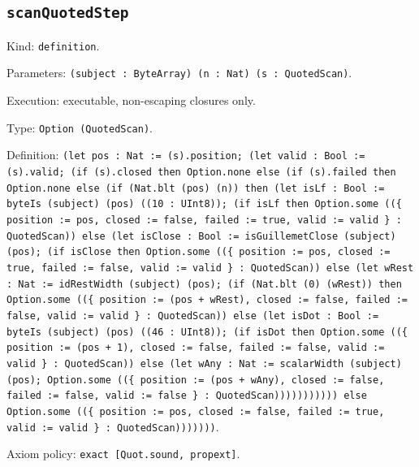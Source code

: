 \documentclass[11pt]{article}
\begin{document}
\subsection*{\texttt{scanQuotedStep}}
\noindent Kind: \texttt{definition}.\par
\noindent Parameters: \texttt{(subject : ByteArray) (n : Nat) (s : QuotedScan)}.\par
\noindent Execution: executable, non-escaping closures only.\par
\noindent Type: \texttt{Option (QuotedScan)}.\par
\noindent Definition: \texttt{(let pos : Nat := (s).position; (let valid : Bool := (s).valid; (if (s).closed then Option.none else (if (s).failed then Option.none else (if (Nat.blt (pos) (n)) then (let isLf : Bool := byteIs (subject) (pos) ((10 : UInt8)); (if isLf then Option.some ((\{ position := pos, closed := false, failed := true, valid := valid \} : QuotedScan)) else (let isClose : Bool := isGuillemetClose (subject) (pos); (if isClose then Option.some ((\{ position := pos, closed := true, failed := false, valid := valid \} : QuotedScan)) else (let wRest : Nat := idRestWidth (subject) (pos); (if (Nat.blt (0) (wRest)) then Option.some ((\{ position := (pos + wRest), closed := false, failed := false, valid := valid \} : QuotedScan)) else (let isDot : Bool := byteIs (subject) (pos) ((46 : UInt8)); (if isDot then Option.some ((\{ position := (pos + 1), closed := false, failed := false, valid := valid \} : QuotedScan)) else (let wAny : Nat := scalarWidth (subject) (pos); Option.some ((\{ position := (pos + wAny), closed := false, failed := false, valid := false \} : QuotedScan))))))))))) else Option.some ((\{ position := pos, closed := false, failed := true, valid := valid \} : QuotedScan)))))))}.\par
\noindent Axiom policy: \texttt{exact [Quot.sound, propext]}.\par
\end{document}
